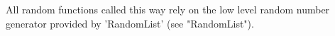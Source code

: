 All random functions called this way rely on  the low level random number
generator provided by 'RandomList' (see "RandomList").




